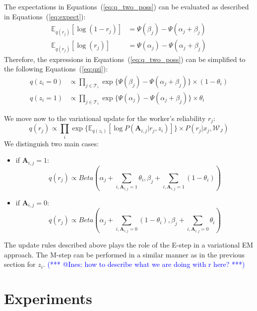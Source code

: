 \documentclass{article}
\makeatletter
\newcommand{\iar}[1]{\textcolor{blue}{(*** @Ines: #1 ***)}}
\makeatother
\begin{document}
The expectations in Equations~(\ref{eq:q_two_poss}) can be evaluated as described in Equations~(\ref{eq:expect}):
\begin{align}
    \mathbb{E}_{q(r_j)}[\log (1-r_j)]&= \Psi(\beta_j)-\Psi(\alpha_j+\beta_j) \nonumber \\
    \mathbb{E}_{q(r_j)}[\log (r_j)]&= \Psi(\alpha_j)-\Psi(\alpha_j+\beta_j)
    \label{eq:expect}
\end{align}
Therefore, the expressions in Equations~(\ref{eq:q_two_poss}) can be simplified to the following Equations~(\ref{eq:qzi}):
\begin{align}
    q(z_i=0)   &\propto \prod_{j \in \mathcal{T}_{i}} \exp{\{\Psi(\beta_j)-\Psi(\alpha_j+\beta_j)\}}\times (1-\theta_i) \nonumber \\  
     q(z_i=1)    &\propto \prod_{j \in \mathcal{T}_{i}} \exp{\{ \Psi(\alpha_j)-\Psi(\alpha_j+\beta_j)\}}\times \theta_i  
     \label{eq:qzi}
\end{align}

We move now to the variational update for the worker's reliability $r_j$:
\begin{equation}
    q(r_j) \propto \prod_{i} \exp{\{\mathbb{E}_{q(z_i)}[\log{P(\mathbf{A}_{i,j}|r_j,z_i)}]\}} \times   {P(r_j|x_j,\mathcal{W}_J)}
\end{equation}
We distinguish two main cases:
\begin{itemize}
\item if $\mathbf{A}_{i,j}=1$:
\begin{equation}
  q(r_j)  \propto Beta(\alpha_j+\sum_{i,\mathbf{A}_{i,j}=1}  \theta_i,\beta_j+ \sum_{i,\mathbf{A}_{i,j}=1} (1 - \theta_i) )
  \label{eq:rj_aij_1}
\end{equation}
\item if $\mathbf{A}_{i,j}=0$:
\begin{equation}
 q(r_j)  \propto Beta(\alpha_j+\sum_{i,\mathbf{A}_{i,j}=0} (1 - \theta_i),\beta_j+ \sum_{i,\mathbf{A}_{i,j}=0} \theta_i)
   \label{eq:rj_aij_0}
\end{equation}
\end{itemize}
The update rules described above plays the role of the E-step in a variational EM approach. 
The M-step can be performed in a similar manner as in the previous section for $z_i$.
\iar{how to describe what we are doing with r here?}
\section{Experiments}
\end{document}
